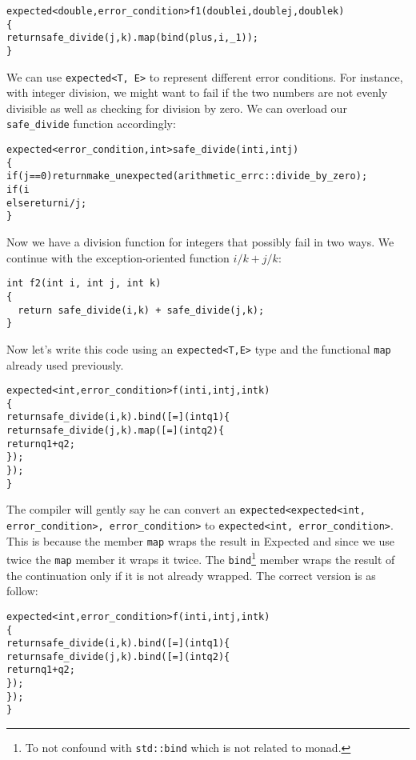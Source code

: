 \documentclass[a4paper,10pt]{article}
\newcommand{\cpp}[1]{\lstinline{#1}}
\begin{document}
\begin{alltt}
expected<double, error_condition> f1(double i, double j, double k)
\{
  return safe_divide(j, k).map(bind(plus, i, _1));
\}
\end{alltt}

We can use \cpp{expected<T, E>} to represent different error conditions. For instance, with integer division, we might want to fail if the two numbers are not evenly divisible as well as checking for division by zero. We can overload our \cpp{safe_divide} function accordingly:

\begin{alltt}
expected<error_condition, int> safe_divide(int i, int j)
\{
  if (j == 0) return make_unexpected(arithmetic_errc::divide_by_zero); 
  if (i%j != 0) return make_unexpected(arithmetic_errc::not_integer_division);
  else return i / j;
\}
\end{alltt}

Now we have a division function for integers that possibly fail in two ways. We continue with the exception-oriented function $i/k + j/k$:

\begin{lstlisting}
int f2(int i, int j, int k)
{
  return safe_divide(i,k) + safe_divide(j,k);
}
\end{lstlisting}

\noindent
Now let's write this code using an \cpp{expected<T,E>} type and the functional \cpp{map} already used previously.

\begin{alltt}
expected<int,error_condition> f(int i, int j, int k)
\{
  return safe_divide(i, k).bind([=](int q1) \{
      return safe_divide(j,k).map([=](int q2) \{
        return q1+q2;
      \});
    \});
\}
\end{alltt}

The compiler will gently say he can convert an \cpp{expected<expected<int, error_condition>, error_condition>} to \cpp{expected<int, error_condition>}. This is because the member \cpp{map} wraps the result in Expected and since we use twice the \cpp{map} member it wraps it twice. The \cpp{bind}\footnote{To not confound with \cpp{std::bind} which is not related to monad.} member wraps the result of the continuation only if it is not already wrapped. The correct version is as follow:

\begin{alltt}
expected<int, error_condition> f(int i, int j, int k)
\{
  return safe_divide(i, k).bind([=](int q1) \{
      return safe_divide(j,k).bind([=](int q2) \{
        return q1+q2;
      \});
    \});
\}
\end{alltt}
\end{document}
